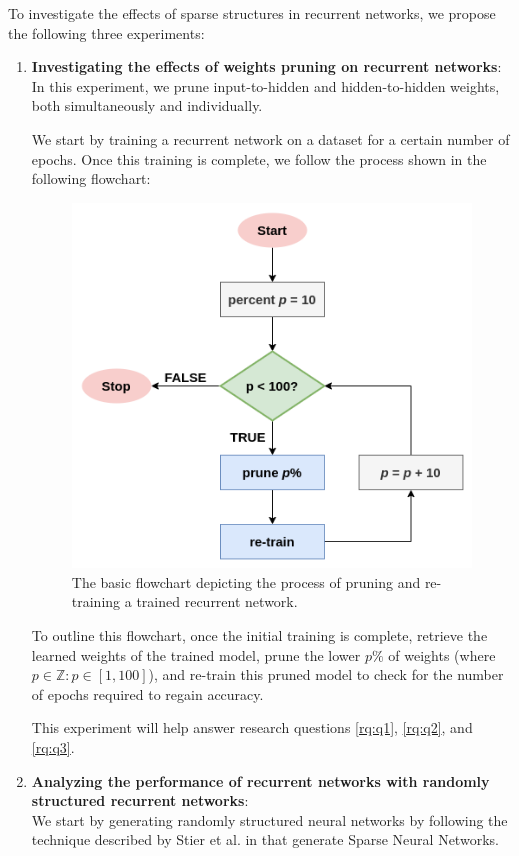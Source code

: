 To investigate the effects of sparse structures in recurrent networks, we propose the following three experiments:
\begin{enumerate}
	\item \textbf{Investigating the effects of weights pruning on recurrent networks}: \\
	    In this experiment, we prune input-to-hidden and hidden-to-hidden weights, both simultaneously and individually.
	    
	    We start by training a recurrent network on a dataset for a certain number of epochs. Once this training is complete, we follow the process shown in the following flowchart:
	    
	    \begin{figure}[h]
            \centering
            \includegraphics[width=0.5\linewidth]{images/introduction/flow_1.png}
            \caption[Flowchart for the pruning experiment]{The basic flowchart depicting the process of pruning and re-training a trained recurrent network.}
            \label{fig:flowchart_pruning}
        \end{figure}
        
    	 To outline this flowchart, once the initial training is complete, retrieve the learned weights of the trained model, prune the lower $p\%$ of weights (where $p \in \mathbb{Z}:p \in [1, 100]$), and re-train this pruned model to check for the number of epochs required to regain accuracy.
    	 
    	 This experiment will help answer research questions \ref{rq:q1}, \ref{rq:q2}, and \ref{rq:q3}.
    	
	\item \textbf{Analyzing the performance of recurrent networks with randomly structured recurrent networks}: \\
	    We start by generating randomly structured neural networks by following the technique described by Stier et al. in \cite{julian} that generate Sparse Neural Networks.


\end{enumerate}
